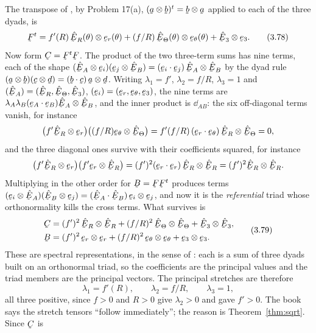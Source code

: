 The transpose of , by Problem 17(a), $(\ba\otimes\bb)^{t}
=\bb\otimes\ba$ applied to each of the three dyads, is
\begin{equation}
   \bF^{t}=f'(R)\,\hER(\theta)\otimes\ber(\theta)
          +(f/R)\,\hETh(\theta)\otimes\bet(\theta)
          +\hbE_{3}\otimes\be_{3}.
   \tag{3.78}\label{eq:3.78}
\end{equation}
Now form $\bC=\bF^{t}\bF$. The product of the two three-term sums has nine
terms, each of the shape
$(\hbE_{A}\otimes\be_{i})(\be_{j}\otimes\hbE_{B})
=(\ip{\be_{i}}{\be_{j}})\,\hbE_{A}\otimes\hbE_{B}$ by the dyad rule
$(\ba\otimes\bb)(\bc\otimes\bd)=(\ip\bb\bc)\,\ba\otimes\bd$. Writing
$\lambda_{1}=f'$, $\lambda_{2}=f/R$, $\lambda_{3}=1$ and
$(\hbE_{A})=(\hER,\hETh,\hbE_{3})$, $(\be_{i})=(\ber,\bet,\be_{3})$, the
nine terms are $\lambda_{A}\lambda_{B}(\ip{\be_{A}}{\be_{B}})
\hbE_{A}\otimes\hbE_{B}$, and the inner product is $\dd_{AB}$: the six
off-diagonal terms vanish, for instance
\[
   \big(f'\hER\otimes\ber\big)\big((f/R)\bet\otimes\hETh\big)
   =f'(f/R)\,(\ip{\ber}{\bet})\,\hER\otimes\hETh=0 ,
\]
and the three diagonal ones survive with their coefficients squared, for
instance
\[
   \big(f'\hER\otimes\ber\big)\big(f'\ber\otimes\hER\big)
   =(f')^{2}(\ip{\ber}{\ber})\,\hER\otimes\hER=(f')^{2}\hER\otimes\hER .
\]
Multiplying in the other order for $\bB=\bF\bF^{t}$ produces terms
$(\be_{i}\otimes\hbE_{A})(\hbE_{B}\otimes\be_{j})
=(\ip{\hbE_{A}}{\hbE_{B}})\,\be_{i}\otimes\be_{j}$, and now it is the
\emph{referential} triad whose orthonormality kills the cross terms. What
survives is
\begin{equation}
\begin{aligned}
   \bC&=(f')^{2}\,\hER\otimes\hER+(f/R)^{2}\,\hETh\otimes\hETh
       +\hbE_{3}\otimes\hbE_{3},\\
   \bB&=(f')^{2}\,\ber\otimes\ber+(f/R)^{2}\,\bet\otimes\bet
       +\be_{3}\otimes\be_{3}.
\end{aligned}
   \tag{3.79}\label{eq:3.79}
\end{equation}
These are spectral representations, in the sense of : each is a sum
of three dyads built on an orthonormal triad, so the coefficients are the
principal values and the triad members are the principal vectors. The
principal stretches are therefore
\[
   \lambda_{1}=f'(R),\qquad \lambda_{2}=f/R,\qquad \lambda_{3}=1,
\]
all three positive, since $f>0$ and $R>0$ give $\lambda_{2}>0$ and
 gave $f'>0$. The book says the stretch tensors ``follow
immediately''; the reason is Theorem~\ref{thm:sqrt}. Since $\bC$ is
